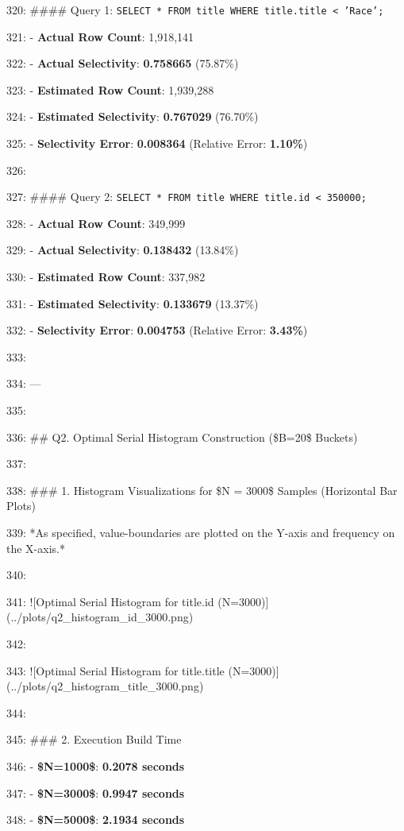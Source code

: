 \documentclass[11pt,a4paper]{article}
\begin{document}
{320: \#\#\#\# Query 1: \texttt{SELECT * FROM title WHERE title.title < 'Race';}

321: - \textbf{Actual Row Count}: 1,918,141

322: - \textbf{Actual Selectivity}: \textbf{0.758665} (75.87\%)

323: - \textbf{Estimated Row Count}: 1,939,288

324: - \textbf{Estimated Selectivity}: \textbf{0.767029} (76.70\%)

325: - \textbf{Selectivity Error}: \textbf{0.008364} (Relative Error: \textbf{1.10\%})

326:

327: \#\#\#\# Query 2: \texttt{SELECT * FROM title WHERE title.id < 350000;}

328: - \textbf{Actual Row Count}: 349,999

329: - \textbf{Actual Selectivity}: \textbf{0.138432} (13.84\%)

330: - \textbf{Estimated Row Count}: 337,982

331: - \textbf{Estimated Selectivity}: \textbf{0.133679} (13.37\%)

332: - \textbf{Selectivity Error}: \textbf{0.004753} (Relative Error: \textbf{3.43\%})

333:

334: ---

335:

336: \#\# Q2. Optimal Serial Histogram Construction (\$B=20\$ Buckets)

337:

338: \#\#\# 1. Histogram Visualizations for \$N = 3000\$ Samples (Horizontal Bar Plots)

339: *As specified, value-boundaries are plotted on the Y-axis and frequency on the X-axis.*

340:

341: ![Optimal Serial Histogram for title.id (N=3000)](../plots/q2\_histogram\_id\_3000.png)

342:

343: ![Optimal Serial Histogram for title.title (N=3000)](../plots/q2\_histogram\_title\_3000.png)

344:

345: \#\#\# 2. Execution Build Time

346: - \textbf{\$N=1000\$}: \textbf{0.2078 seconds}

347: - \textbf{\$N=3000\$}: \textbf{0.9947 seconds}

348: - \textbf{\$N=5000\$}: \textbf{2.1934 seconds}

}
\end{document}
